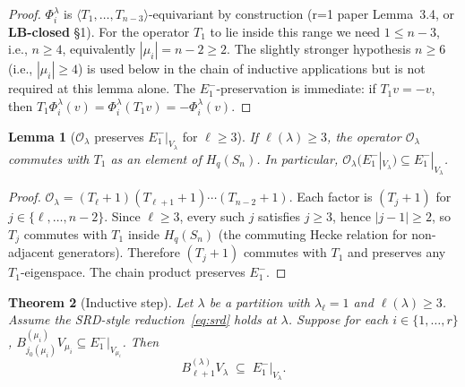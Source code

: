 \documentclass[11pt]{article}
\newtheorem{theorem}{Theorem}
\newtheorem{lemma}[theorem]{Lemma}
\theoremstyle{definition}
\begin{document}
\begin{proof}
$\Phi_i^\lambda$ is $\langle T_1, \ldots, T_{n-3}\rangle$-equivariant
by construction (r=1 paper Lemma~3.4, or
\textbf{LB-closed} \S1). For the operator $T_1$ to lie inside this
range we need $1 \le n - 3$, i.e., $n \ge 4$, equivalently
$|\mu_i| = n - 2 \ge 2$. The slightly stronger hypothesis
$n \ge 6$ (i.e., $|\mu_i| \ge 4$) is used below in the chain of
inductive applications but is not required at this lemma alone. The
$E_1^-$-preservation is immediate: if $T_1 v = -v$, then
$T_1 \Phi_i^\lambda(v) = \Phi_i^\lambda(T_1 v) = -\Phi_i^\lambda(v)$.
\end{proof}

\begin{lemma}[$\mathcal{O}_\lambda$ preserves $E_1^-|_{V_\lambda}$ for $\ell \ge 3$]\label{lem:O-E1minus}
If $\ell(\lambda) \ge 3$, the operator $\mathcal{O}_\lambda$ commutes
with $T_1$ as an element of $H_q(S_n)$. In particular,
$\mathcal{O}_\lambda(E_1^-|_{V_\lambda}) \subseteq E_1^-|_{V_\lambda}$.
\end{lemma}

\begin{proof}
$\mathcal{O}_\lambda = (T_\ell{+}1)(T_{\ell+1}{+}1)\cdots(T_{n-2}{+}1)$.
Each factor is $(T_j{+}1)$ for $j \in \{\ell, \ldots, n-2\}$. Since
$\ell \ge 3$, every such $j$ satisfies $j \ge 3$, hence
$|j - 1| \ge 2$, so $T_j$ commutes with $T_1$ inside $H_q(S_n)$
(the commuting Hecke relation for non-adjacent generators). Therefore
$(T_j{+}1)$ commutes with $T_1$ and preserves any $T_1$-eigenspace.
The chain product preserves $E_1^-$.
\end{proof}

\begin{theorem}[Inductive step]\label{thm:induction-step}
Let $\lambda$ be a partition with $\lambda_\ell = 1$ and $\ell(\lambda) \ge 3$.
Assume the SRD-style reduction~\eqref{eq:srd} holds at $\lambda$.
Suppose for each $i \in \{1, \ldots, r\}$,
$B^{(\mu_i)}_{j_0(\mu_i)} V_{\mu_i} \subseteq E_1^-|_{V_{\mu_i}}$.
Then
\[
   B^{(\lambda)}_{\ell+1} V_\lambda \;\subseteq\; E_1^-|_{V_\lambda}.
\]
\end{theorem}
\end{document}
